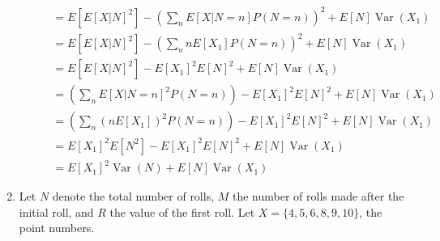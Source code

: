 \documentclass{article}
\DeclareMathOperator{\Var}{Var}
\begin{document}
\begin{enumerate}
\begin{enumerate}
\begin{equation*}
\begin{split}
                & = E[E[X|N]^2] - \left( \sum_n E[X|N=n]P(N=n) \right)^2 + E[N]\Var(X_1) \\
                & = E[E[X|N]^2] - \left( \sum_n nE[X_1]P(N=n) \right)^2 + E[N]\Var(X_1) \\
                & = E[E[X|N]^2] - E[X_1]^2E[N]^2 + E[N]\Var(X_1) \\
                & = \left( \sum_n E[X|N=n]^2P(N=n) \right) - E[X_1]^2E[N]^2 + E[N]\Var(X_1) \\
                & = \left( \sum_n (nE[X_1])^2P(N=n) \right) - E[X_1]^2E[N]^2 + E[N]\Var(X_1) \\
                & = E[X_1]^2E[N^2] - E[X_1]^2E[N]^2 + E[N]\Var(X_1) \\
                & = E[X_1]^2\Var(N) + E[N]\Var(X_1)
        \end{split}\end{equation*}
    \end{enumerate}
\item
    Let $N$ denote the total number of rolls, $M$ the number of rolls made after the initial roll, and $R$ the value of the first roll.
    Let $X=\{4,5,6,8,9,10\}$, the point numbers.


\end{enumerate}
\end{document}

